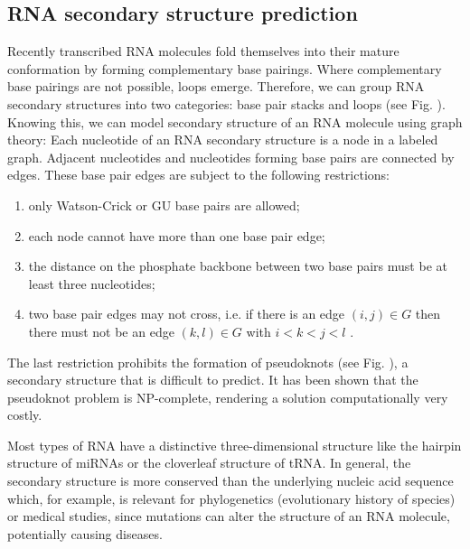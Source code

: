 \subsection{RNA secondary structure prediction} 
Recently transcribed RNA molecules fold themselves into their mature conformation by forming complementary base pairings. Where complementary base pairings are not possible, loops emerge. Therefore, we can group RNA secondary structures into two categories: base pair stacks and loops (see Fig. ). Knowing this, we can model secondary structure of an RNA molecule using graph theory: Each nucleotide of an RNA secondary structure is a node in a labeled graph. Adjacent nucleotides and nucleotides forming base pairs are connected by edges. These base pair edges are subject to the following restrictions:

\begin{enumerate}
	\item only Watson-Crick or GU base pairs are allowed;
	\item each node cannot have more than one base pair edge;
	\item the distance on the phosphate backbone between two base pairs must be at least three nucleotides;
	\item two base pair edges may not cross, i.e. if there is an edge $(i,j) \in G$ then there must not be an edge $(k,l) \in G$ with $i<k<j<l$ .
\end{enumerate} 
The last restriction prohibits the formation of pseudoknots (see Fig. ), a secondary structure that is difficult to predict. It has been shown that the pseudoknot problem is NP-complete, rendering a solution computationally very costly. \citep{pmid22115189}

Most types of RNA have a distinctive three-dimensional structure like the hairpin structure of miRNAs or the cloverleaf structure of tRNA. In general, the secondary structure is more conserved than the underlying nucleic acid sequence which, for example, is relevant for phylogenetics (evolutionary history of species) or medical studies, since mutations can alter the structure of an RNA molecule, potentially causing diseases.  


